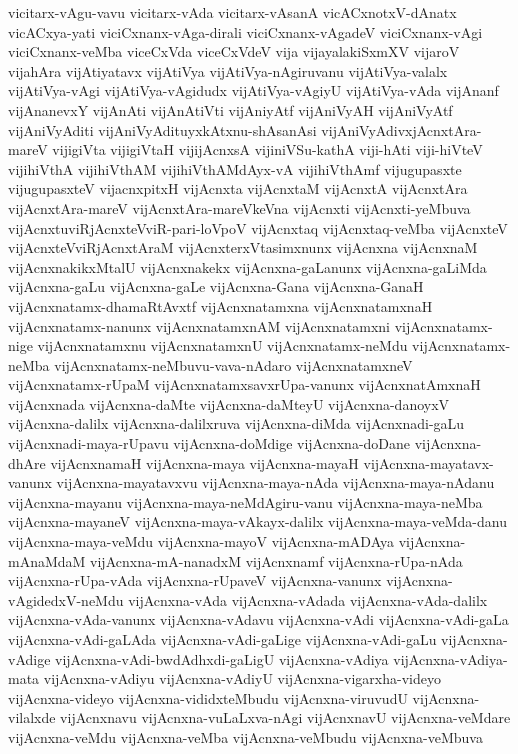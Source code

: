 {vicitarx-vAgu-vavu
vicitarx-vAda
vicitarx-vAsanA
vicACxnotxV-dAnatx
vicACxya-yati
viciCxnanx-vAga-dirali
viciCxnanx-vAgadeV
viciCxnanx-vAgi
viciCxnanx-veMba
viceCxVda
viceCxVdeV
vija
vijayalakiSxmXV
vijaroV
vijahAra
vijAtiyatavx
vijAtiVya
vijAtiVya-nAgiruvanu
vijAtiVya-valalx
vijAtiVya-vAgi
vijAtiVya-vAgidudx
vijAtiVya-vAgiyU
vijAtiVya-vAda
vijAnanf
vijAnanevxY
vijAnAti
vijAnAtiVti
vijAniyAtf
vijAniVyAH
vijAniVyAtf
vijAniVyAditi
vijAniVyAdituyxkAtxnu-shAsanAsi
vijAniVyAdivxjAcnxtAra-mareV
vijigiVta
vijigiVtaH
vijijAcnxsA
vijiniVSu-kathA
viji-hAti
viji-hiVteV
vijihiVthA
vijihiVthAM
vijihiVthAMdAyx-vA
vijihiVthAmf
vijugupasxte
vijugupasxteV
vijacnxpitxH
vijAcnxta
vijAcnxtaM
vijAcnxtA
vijAcnxtAra
vijAcnxtAra-mareV
vijAcnxtAra-mareVkeVna
vijAcnxti
vijAcnxti-yeMbuva
vijAcnxtuviRjAcnxteVviR-pari-loVpoV
vijAcnxtaq
vijAcnxtaq-veMba
vijAcnxteV
vijAcnxteVviRjAcnxtAraM
vijAcnxterxVtasimxnunx
vijAcnxna
vijAcnxnaM
vijAcnxnakikxMtalU
vijAcnxnakekx
vijAcnxna-gaLanunx
vijAcnxna-gaLiMda
vijAcnxna-gaLu
vijAcnxna-gaLe
vijAcnxna-Gana
vijAcnxna-GanaH
vijAcnxnatamx-dhamaRtAvxtf
vijAcnxnatamxna
vijAcnxnatamxnaH
vijAcnxnatamx-nanunx
vijAcnxnatamxnAM
vijAcnxnatamxni
vijAcnxnatamx-nige
vijAcnxnatamxnu
vijAcnxnatamxnU
vijAcnxnatamx-neMdu
vijAcnxnatamx-neMba
vijAcnxnatamx-neMbuvu-vava-nAdaro
vijAcnxnatamxneV
vijAcnxnatamx-rUpaM
vijAcnxnatamxsavxrUpa-vanunx
vijAcnxnatAmxnaH
vijAcnxnada
vijAcnxna-daMte
vijAcnxna-daMteyU
vijAcnxna-danoyxV
vijAcnxna-dalilx
vijAcnxna-dalilxruva
vijAcnxna-diMda
vijAcnxnadi-gaLu
vijAcnxnadi-maya-rUpavu
vijAcnxna-doMdige
vijAcnxna-doDane
vijAcnxna-dhAre
vijAcnxnamaH
vijAcnxna-maya
vijAcnxna-mayaH
vijAcnxna-mayatavx-vanunx
vijAcnxna-mayatavxvu
vijAcnxna-maya-nAda
vijAcnxna-maya-nAdanu
vijAcnxna-mayanu
vijAcnxna-maya-neMdAgiru-vanu
vijAcnxna-maya-neMba
vijAcnxna-mayaneV
vijAcnxna-maya-vAkayx-dalilx
vijAcnxna-maya-veMda-danu
vijAcnxna-maya-veMdu
vijAcnxna-mayoV
vijAcnxna-mADAya
vijAcnxna-mAnaMdaM
vijAcnxna-mA-nanadxM
vijAcnxnamf
vijAcnxna-rUpa-nAda
vijAcnxna-rUpa-vAda
vijAcnxna-rUpaveV
vijAcnxna-vanunx
vijAcnxna-vAgidedxV-neMdu
vijAcnxna-vAda
vijAcnxna-vAdada
vijAcnxna-vAda-dalilx
vijAcnxna-vAda-vanunx
vijAcnxna-vAdavu
vijAcnxna-vAdi
vijAcnxna-vAdi-gaLa
vijAcnxna-vAdi-gaLAda
vijAcnxna-vAdi-gaLige
vijAcnxna-vAdi-gaLu
vijAcnxna-vAdige
vijAcnxna-vAdi-bwdAdhxdi-gaLigU
vijAcnxna-vAdiya
vijAcnxna-vAdiya-mata
vijAcnxna-vAdiyu
vijAcnxna-vAdiyU
vijAcnxna-vigarxha-videyo
vijAcnxna-videyo
vijAcnxna-vididxteMbudu
vijAcnxna-viruvudU
vijAcnxna-vilalxde
vijAcnxnavu
vijAcnxna-vuLaLxva-nAgi
vijAcnxnavU
vijAcnxna-veMdare
vijAcnxna-veMdu
vijAcnxna-veMba
vijAcnxna-veMbudu
vijAcnxna-veMbuva
}
